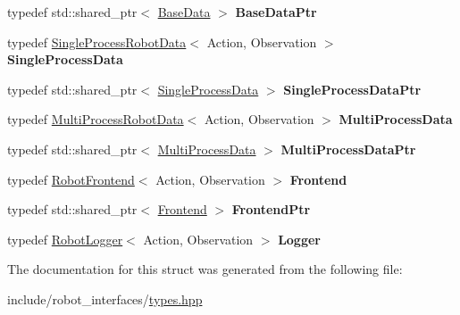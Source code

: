 \begin{DoxyCompactItemize}
typedef std\+::shared\+\_\+ptr$<$ \hyperlink{classrobot__interfaces_1_1RobotData}{Base\+Data} $>$ {\bfseries Base\+Data\+Ptr}
\item 
\mbox{\label{structrobot__interfaces_1_1RobotInterfaceTypes_a22946beb557466ad2fc7a165ad75ee4e}} 
typedef \hyperlink{classrobot__interfaces_1_1SingleProcessRobotData}{Single\+Process\+Robot\+Data}$<$ Action, Observation $>$ {\bfseries Single\+Process\+Data}
\item 
\mbox{\label{structrobot__interfaces_1_1RobotInterfaceTypes_a284d7269a2540e6172f5a2d818affdb7}} 
typedef std\+::shared\+\_\+ptr$<$ \hyperlink{classrobot__interfaces_1_1SingleProcessRobotData}{Single\+Process\+Data} $>$ {\bfseries Single\+Process\+Data\+Ptr}
\item 
\mbox{\label{structrobot__interfaces_1_1RobotInterfaceTypes_a19704fe101530f21be29abeb027db8a6}} 
typedef \hyperlink{classrobot__interfaces_1_1MultiProcessRobotData}{Multi\+Process\+Robot\+Data}$<$ Action, Observation $>$ {\bfseries Multi\+Process\+Data}
\item 
\mbox{\label{structrobot__interfaces_1_1RobotInterfaceTypes_ade20e23b4bb9e0b17ebbedcfe25354a8}} 
typedef std\+::shared\+\_\+ptr$<$ \hyperlink{classrobot__interfaces_1_1MultiProcessRobotData}{Multi\+Process\+Data} $>$ {\bfseries Multi\+Process\+Data\+Ptr}
\item 
\mbox{\label{structrobot__interfaces_1_1RobotInterfaceTypes_aecff7b2abe93ce6c7e04d78b2a29fc9c}} 
typedef \hyperlink{classrobot__interfaces_1_1RobotFrontend}{Robot\+Frontend}$<$ Action, Observation $>$ {\bfseries Frontend}
\item 
\mbox{\label{structrobot__interfaces_1_1RobotInterfaceTypes_a88ee1efbe73d59741063d1d5aa8964c3}} 
typedef std\+::shared\+\_\+ptr$<$ \hyperlink{classrobot__interfaces_1_1RobotFrontend}{Frontend} $>$ {\bfseries Frontend\+Ptr}
\item 
\mbox{\label{structrobot__interfaces_1_1RobotInterfaceTypes_a327e38bdf0bdff1da9f58fd186aed5c6}} 
typedef \hyperlink{classrobot__interfaces_1_1RobotLogger}{Robot\+Logger}$<$ Action, Observation $>$ {\bfseries Logger}
\end{DoxyCompactItemize}


The documentation for this struct was generated from the following file\+:\begin{DoxyCompactItemize}
\item 
include/robot\+\_\+interfaces/\hyperlink{include_2robot__interfaces_2types_8hpp}{types.\+hpp}\end{DoxyCompactItemize}
